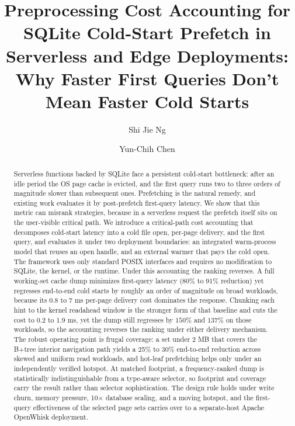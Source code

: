 \documentclass[sigconf, nonacm]{acmart}
\begin{document}
\title{Preprocessing Cost Accounting for SQLite Cold-Start Prefetch in Serverless and Edge Deployments: Why Faster First Queries Don't Mean Faster Cold Starts}

\author{Shi Jie Ng}

\author{Yun-Chih Chen}


\begin{abstract}
Serverless functions backed by SQLite face a persistent cold-start bottleneck: after an idle period the OS page cache is evicted, and the first query runs two to three orders of magnitude slower than subsequent ones. Prefetching is the natural remedy, and existing work evaluates it by post-prefetch first-query latency. We show that this metric can misrank strategies, because in a serverless request the prefetch itself sits on the user-visible critical path. We introduce a critical-path cost accounting that decomposes cold-start latency into a cold file open, per-page delivery, and the first query, and evaluates it under two deployment boundaries: an integrated warm-process model that reuses an open handle, and an external warmer that pays the cold open. The framework uses only standard POSIX interfaces and requires no modification to SQLite, the kernel, or the runtime. Under this accounting the ranking reverses. A full working-set cache dump minimizes first-query latency (80\% to 91\% reduction) yet regresses end-to-end cold starts by roughly an order of magnitude on broad workloads, because its 0.8 to 7 ms per-page delivery cost dominates the response. Chunking each hint to the kernel readahead window is the stronger form of that baseline and cuts the cost to 0.2 to 1.9 ms, yet the dump still regresses by $150\%$ and $137\%$ on those workloads, so the accounting reverses the ranking under either delivery mechanism. The robust operating point is frugal coverage: a set under 2 MB that covers the B+tree interior navigation path yields a 25\% to 30\% end-to-end reduction across skewed and uniform read workloads, and hot-leaf prefetching helps only under an independently verified hotspot. At matched footprint, a frequency-ranked dump is statistically indistinguishable from a type-aware selector, so footprint and coverage carry the result rather than selector sophistication. The design rule holds under write churn, memory pressure, 10× database scaling, and a moving hotspot, and the first-query effectiveness of the selected page sets carries over to a separate-host Apache OpenWhisk deployment.
\end{abstract}
\end{document}
